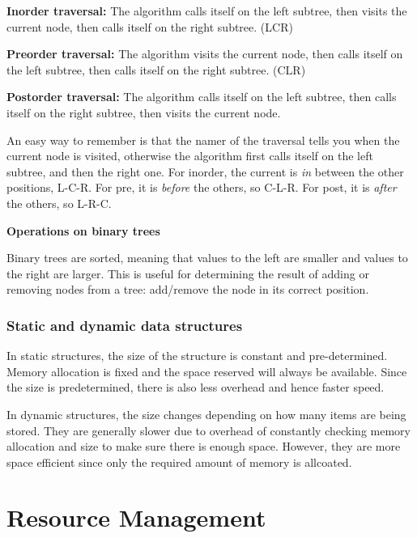 \documentclass{article}
\begin{document}
\textbf{Inorder traversal:} The algorithm calls itself on the left subtree,
then visits the current node, then calls itself on the right subtree. (LCR)

\textbf{Preorder traversal:} The algorithm visits the current node, then calls
itself on the left subtree, then calls itself on the right subtree. (CLR)

\textbf{Postorder traversal:} The algorithm calls itself on the left subtree,
then calls itself on the right subtree, then visits the current node.

An easy way to remember is that the namer of the traversal tells you when the
current node is visited, otherwise the algorithm first calls itself on the left
subtree, and then the right one. For inorder, the current is \textit{in}
between the other positions, L-C-R. For pre, it is \textit{before} the others,
so C-L-R. For post, it is \textit{after} the others, so L-R-C.

\textbf{Operations on binary trees}

Binary trees are sorted, meaning that values to the left are smaller and values
to the right are larger. This is useful for determining the result of adding
or removing nodes from a tree: add/remove the node in its correct position.

\subsubsection{Static and dynamic data structures}

In static structures, the size of the structure is constant and pre-determined.
Memory allocation is fixed and the space reserved will always be available.
Since the size is predetermined, there is also less overhead and hence faster
speed.

In dynamic structures, the size changes depending on how many items are being
stored. They are generally slower due to overhead of constantly checking
memory allocation and size to make sure there is enough space. However, they
are more space efficient since only the required amount of memory is allcoated.

\section{Resource Management}
\end{document}
